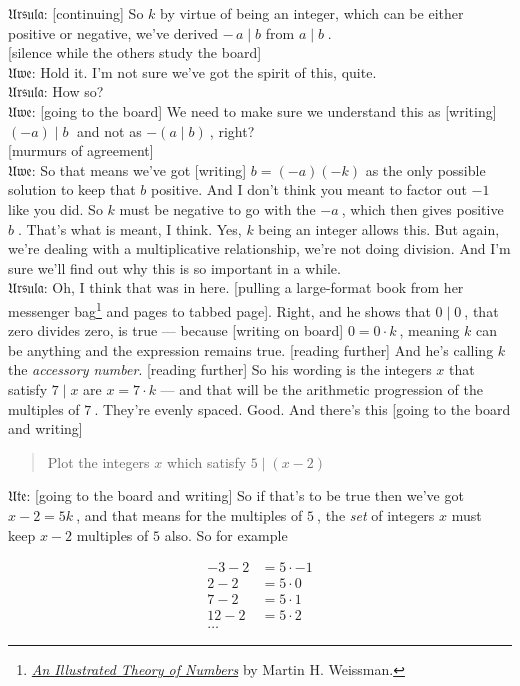 \documentclass[american]{article}
\begin{document}
𝔘𝔯𝔰𝔲𝔩𝔞: [continuing] So
\(k\) by virtue of being an integer, which can be either positive or
negative, we've derived \(-\, a \mid b\) from \(a \mid b\;\). \\[0pt]
[silence while the others study the board] \\[0pt]
𝔘𝔴𝔢: Hold it. I'm not
sure we've got the spirit of this, quite. \\[0pt]
𝔘𝔯𝔰𝔲𝔩𝔞: How so? \\[0pt]
𝔘𝔴𝔢: [going to the
board] We need to make sure we understand this as [writing] \((-a) \mid
b\;\) and not as \(-(a \mid b)\:\), right? \\[0pt]
[murmurs of agreement] \\[0pt]
𝔘𝔴𝔢: So that means
we've got [writing] \(b = (-a)(-k)\) as the only possible solution to
keep that \(b\) positive. And I don't think you meant to factor out
\(-1\:\) like you did. So \(k\) must be negative to go with the \(-a\:\),
which then gives positive \(b\;\). That's what is meant, I think. Yes,
\(k\) being an integer allows this. But again, we're dealing with a
multiplicative relationship, we're not doing division. And I'm sure
we'll find out why this is so important in a while. \\[0pt]
𝔘𝔯𝔰𝔲𝔩𝔞: Oh, I think
that was in here. [pulling a large-format book from her messenger
bag\footnote{\emph{\href{http://illustratedtheoryofnumbers.com/}{An Illustrated Theory of Numbers}} by Martin H. Weissman.} and pages to tabbed page]. Right, and he shows that \(0 \mid
0\:\), that zero divides zero, is true --- because [writing on board]
\(0 = 0 \cdot k\:\), meaning \(k\) can be anything and the expression remains
true. [reading further] And he's calling \(k\) the \emph{accessory
number}. [reading further] So his wording is the integers \(x\) that
satisfy \(7 \mid x\) are \(x = 7 \cdot k\) --- and that will be the arithmetic
progression of the multiples of \(7\:\). They're evenly
spaced. Good. And there's this [going to the board and writing] \\[0pt]

\begin{quote}
Plot the integers \(x\) which satisfy \(5 \mid (x - 2)\)
\end{quote}

𝔘𝔱𝔢: [going to the
board and writing] So if that's to be true then we've got \(x - 2 =
5k\:\), and that means for the multiples of \(5\:\), the \emph{set} of
integers \(x\) must keep \(x - 2\) multiples of \(5\) also. So for example

\begin{align*}
-3 - 2 &= 5 \cdot -1 \\[.4em]
2 - 2 &= 5 \cdot 0 \\[.4em]
7 - 2 &= 5 \cdot 1 \\[.4em]
12 - 2 &= 5 \cdot 2 \\[.4em]
\ldots
\end{align*}
\end{document}
